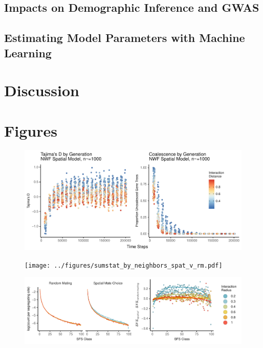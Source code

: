 \documentclass[12pt]{amsart}
\begin{document}
\subsection{ Impacts on Demographic Inference and GWAS }

\subsection{ Estimating Model Parameters with Machine Learning }


\section{ Discussion } 

\section{Figures}


\begin{figure}[h]
	\centerline{
	\includegraphics{../figures/10kouts_coalescence_by_generation}
	}
\end{figure}


\begin{figure}[h]
	\centerline{
	\texttt{[image: ../figures/sumstat\_by\_neighbors\_spat\_v\_rm.pdf]}
	}
\end{figure}

\begin{figure}[h]
	\centerline{
	\includegraphics{../figures/sfs_spatial_v_rm.pdf}
	}
\end{figure}
\end{document}
